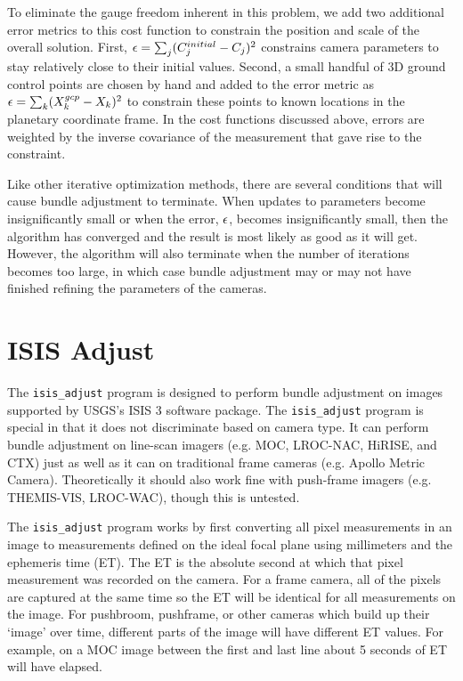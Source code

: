 To eliminate the gauge freedom inherent in this problem, we add two
additional error metrics to this cost function to constrain the position
and scale of the overall solution. First, ${\bf \epsilon} =
\sum_j(C_j^{initial}-C_j)^2$ constrains camera parameters to stay
relatively close to their initial values.  Second, a small handful of
3D ground control points are chosen by hand and added to the
error metric as ${\bf \epsilon} = \sum_k(X_k^{gcp}-X_k)^2$ to
constrain these points to known locations in the planetary coordinate
frame.  In the cost functions discussed above, errors are weighted by
the inverse covariance of the measurement that gave rise to the
constraint.

Like other iterative optimization methods, there are several
conditions that will cause bundle adjustment to terminate.  When
updates to parameters become insignificantly small or when the error,
${\bf \epsilon}$, becomes insignificantly small, then the algorithm
has converged and the result is most likely as good as it will get.
However, the algorithm will also terminate when the number of
iterations becomes too large, in which case bundle adjustment may or
may not have finished refining the parameters of the cameras.  

\section{ISIS Adjust}

The \texttt{isis\_adjust} program is designed to perform bundle
adjustment on images supported by USGS's ISIS 3 software package.
The \texttt{isis\_adjust} program is special in that it does not
discriminate based on camera type. It can perform bundle adjustment
on line-scan imagers (e.g. MOC, LROC-NAC, HiRISE, and CTX) just
as well as it can on traditional frame cameras (e.g. Apollo
Metric Camera).  Theoretically it should also work fine with
push-frame imagers (e.g. THEMIS-VIS, LROC-WAC), though this is untested.

The \texttt{isis\_adjust} program works by first converting all
pixel measurements in an image to measurements defined on the ideal
focal plane using millimeters and the ephemeris time (ET). The ET
is the absolute second at which that pixel measurement was recorded
on the camera.  For a frame camera, all of the pixels are captured
at the same time so the ET will be identical for all measurements
on the image.  For pushbroom, pushframe, or other cameras which
build up their `image' over time, different parts of the image will
have different ET values.  For example, on a MOC image between the
first and last line about 5 seconds of ET will have elapsed.


